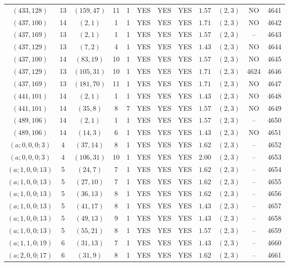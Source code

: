 \begin{longtable}{|c|c|c|c|c|c|c|c|c|c|c|c|}
$(433,128)$ & 13 & $(159,47)$ & 11 & 1 & YES & YES & YES & $1.57$ & $(2,3)$ & NO & 4641\\
$(437,100)$ & 14 & $(2,1)$ & 1 & 1 & YES & YES & YES & $1.71$ & $(2,3)$ & NO & 4642\\
$(437,169)$ & 13 & $(2,1)$ & 1 & 1 & YES & YES & YES & $1.57$ & $(2,3)$ & -- & 4643\\
$(437,129)$ & 13 & $(7,2)$ & 4 & 1 & YES & YES & YES & $1.43$ & $(2,3)$ & NO & 4644\\
$(437,100)$ & 14 & $(83,19)$ & 10 & 1 & YES & YES & YES & $1.57$ & $(2,3)$ & NO & 4645\\
$(437,129)$ & 13 & $(105,31)$ & 10 & 1 & YES & YES & YES & $1.71$ & $(2,3)$ & 4624 & 4646\\
$(437,169)$ & 13 & $(181,70)$ & 11 & 1 & YES & YES & YES & $1.71$ & $(2,3)$ & NO & 4647\\
$(441,101)$ & 14 & $(2,1)$ & 1 & 1 & YES & YES & YES & $1.43$ & $(2,3)$ & NO & 4648\\
$(441,101)$ & 14 & $(35,8)$ & 8 & 7 & YES & YES & YES & $1.57$ & $(2,3)$ & NO & 4649\\
$(489,106)$ & 14 & $(2,1)$ & 1 & 1 & YES & YES & YES & $1.57$ & $(2,3)$ & -- & 4650\\
$(489,106)$ & 14 & $(14,3)$ & 6 & 1 & YES & YES & YES & $1.43$ & $(2,3)$ & NO & 4651\\
$(a;0,0,0;3)$ & 4 & $(37,14)$ & 8 & 1 & YES & YES & YES & $1.62$ & $(2,3)$ & -- & 4652\\
$(a;0,0,0;3)$ & 4 & $(106,31)$ & 10 & 1 & YES & YES & YES & $2.00$ & $(2,3)$ & -- & 4653\\
$(a;1,0,0;13)$ & 5 & $(24,7)$ & 7 & 1 & YES & YES & YES & $1.62$ & $(2,3)$ & -- & 4654\\
$(a;1,0,0;13)$ & 5 & $(27,10)$ & 7 & 1 & YES & YES & YES & $1.62$ & $(2,3)$ & -- & 4655\\
$(a;1,0,0;13)$ & 5 & $(36,13)$ & 8 & 1 & YES & YES & YES & $1.62$ & $(2,3)$ & -- & 4656\\
$(a;1,0,0;13)$ & 5 & $(41,17)$ & 8 & 1 & YES & YES & YES & $1.43$ & $(2,3)$ & -- & 4657\\
$(a;1,0,0;13)$ & 5 & $(49,13)$ & 9 & 1 & YES & YES & YES & $1.43$ & $(2,3)$ & -- & 4658\\
$(a;1,0,0;13)$ & 5 & $(55,21)$ & 8 & 1 & YES & YES & YES & $1.57$ & $(2,3)$ & -- & 4659\\
$(a;1,1,0;19)$ & 6 & $(31,13)$ & 7 & 1 & YES & YES & YES & $1.43$ & $(2,3)$ & -- & 4660\\
$(a;2,0,0;17)$ & 6 & $(31,9)$ & 8 & 1 & YES & YES & YES & $1.62$ & $(2,3)$ & -- & 4661\\

\end{longtable}
